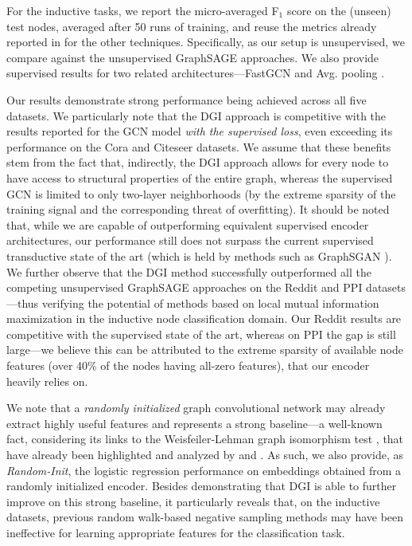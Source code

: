 \documentclass{article} \usepackage{iclr2019_conference,times}
\begin{document}
For the inductive tasks, we report the micro-averaged F$_1$ score on the (unseen) test nodes, averaged after 50 runs of training, and reuse the metrics already reported in \cite{hamilton2017inductive} for the other techniques. Specifically, as our setup is unsupervised, we compare against the unsupervised GraphSAGE approaches. We also provide supervised results for two related architectures---FastGCN \citep{chen2018fastgcn} and Avg. pooling \citep{zhang2018gaan}.

Our results demonstrate strong performance being achieved across all five datasets. We particularly note that the DGI approach is competitive with the results reported for the GCN model \emph{with the supervised loss}, even exceeding its performance on the Cora and Citeseer datasets. We assume that these benefits stem from the fact that, indirectly, the DGI approach allows for every node to have access to structural properties of the entire graph, whereas the supervised GCN is limited to only two-layer neighborhoods (by the extreme sparsity of the training signal and the corresponding threat of overfitting). It should be noted that, while we are capable of outperforming equivalent supervised encoder architectures, our performance still does not surpass the current supervised transductive state of the art (which is held by methods such as GraphSGAN \citep{ding2018semi}). We further observe that the DGI method successfully outperformed all the competing unsupervised GraphSAGE approaches on the Reddit and PPI datasets---thus verifying the potential of methods based on local mutual information maximization in the inductive node classification domain. Our Reddit results are competitive with the supervised state of the art, whereas on PPI the gap is still large---we believe this can be attributed to the extreme sparsity of available node features (over 40\% of the nodes having all-zero features), that our encoder heavily relies on.

We note that a \emph{randomly initialized} graph convolutional network may already extract highly useful features and represents a strong baseline---a well-known fact, considering its links to the Weisfeiler-Lehman graph isomorphism test \citep{weisfeiler1968reduction}, that have already been highlighted and analyzed by \cite{kipf2016semi} and \cite{hamilton2017inductive}. As such, we also provide, as \emph{Random-Init}, the logistic regression performance on embeddings obtained from a randomly initialized encoder. Besides demonstrating that DGI is able to further improve on this strong baseline, it particularly reveals that, on the inductive datasets, previous random walk-based negative sampling methods may have been ineffective for learning appropriate features for the classification task.
\end{document}
